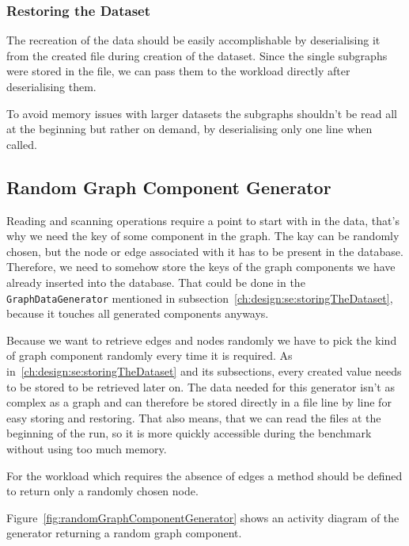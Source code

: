 \subsubsection{Restoring the Dataset}
\label{ch:design:se:restoringTheDataset}
The recreation of the data should be easily accomplishable by deserialising it from the created file during creation of the dataset.
Since the single subgraphs were stored in the file,
we can pass them to the workload directly after deserialising them.

To avoid memory issues with larger datasets the subgraphs shouldn't be read all at the beginning but rather on demand,
by deserialising only one line when called.

\subsection{Random Graph Component Generator}
Reading and scanning operations require a point to start with in the data,
that's why we need the key of some component in the graph.
The kay can be randomly chosen,
but the node or edge associated with it has to be present in the database.
Therefore,
we need to somehow store the keys of the graph components we have already inserted into the database.
That could be done in the \texttt{GraphDataGenerator} mentioned in subsection~\ref{ch:design:se:storingTheDataset},
because it touches all generated components anyways.

Because we want to retrieve edges and nodes randomly we have to pick the kind of graph component randomly every time it is required.
As in~\ref{ch:design:se:storingTheDataset} and its subsections,
every created value needs to be stored to be retrieved later on.
The data needed for this generator isn't as complex as a graph and can therefore be stored directly in a file line by line for easy storing and restoring.
That also means,
that we can read the files at the beginning of the run,
so it is more quickly accessible during the benchmark without using too much memory.

For the workload which requires the absence of edges a method should be defined to return only a randomly chosen node.

Figure~\ref{fig:randomGraphComponentGenerator} shows an activity diagram of the generator returning a random graph component.

